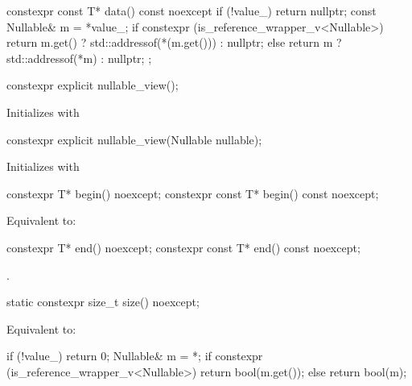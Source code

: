 \documentclass[a4paper,10pt,oneside,openany,final,article]{memoir}
\begin{document}
\begin{wording}
\begin{codeblock}
{    constexpr const T* data() const noexcept {
        if (!value_)
            return nullptr;
        const Nullable& m = *value_;
        if constexpr (is_reference_wrapper_v<Nullable>) {
            return m.get() ? std::addressof(*(m.get())) : nullptr;
        } else {
            return m ? std::addressof(*m) : nullptr;
        }
    }
};

\end{codeblock}

\begin{itemdecl}
  constexpr explicit nullable_view();
\end{itemdecl}
\begin{itemdescr}
  \pnum{}
  \effects{}
  Initializes  with 
\end{itemdescr}

\begin{itemdecl}
  constexpr explicit nullable_view(Nullable nullable);
\end{itemdecl}
\begin{itemdescr}
  \pnum{}
  \effects{}
  Initializes  with 
\end{itemdescr}

\begin{itemdecl}
  constexpr T* begin() noexcept;
  constexpr const T* begin() const noexcept;
\end{itemdecl}

\begin{itemdescr}
  \pnum
  \effects
  Equivalent to: 
\end{itemdescr}

\begin{itemdecl}
  constexpr T* end() noexcept;
  constexpr const T* end() const noexcept;
\end{itemdecl}

\begin{itemdescr}
  \pnum{}
  \returns {}.
\end{itemdescr}

\begin{itemdecl}
  static constexpr size_t size() noexcept;
\end{itemdecl}

\begin{itemdescr}
  \pnum{}
  \effects{}
  Equivalent to:

  \begin{codeblock}
    if (!value_)
    return 0;
    Nullable& m = *;
    if constexpr (is_reference_wrapper_v<Nullable>) {
      return bool(m.get());
    } else {
      return bool(m);
    }
  \end{codeblock}
\end{itemdescr}


\end{wording}
\end{document}
